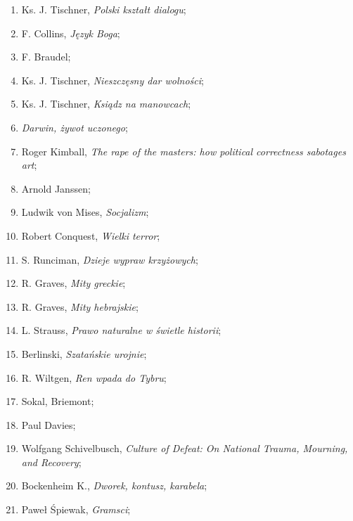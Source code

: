 \documentclass[a4paper,11pt]{article}
\begin{document}
\begin{enumerate}
\item Ks. J. Tischner, \emph{Polski kształt dialogu};

\item F. Collins, \emph{Język Boga};

\item F. Braudel;

\item Ks. J. Tischner, \emph{Nieszczęsny dar wolności};

\item Ks. J. Tischner, \emph{Ksiądz na manowcach};

\item \emph{Darwin, żywot uczonego};

\item Roger Kimball, \emph{The rape of the masters: how political
    correctness sabotages art};

\item Arnold Janssen;

\item Ludwik von Mises, \emph{Socjalizm};

\item Robert Conquest, \emph{Wielki terror};

\item S. Runciman, \emph{Dzieje wypraw krzyżowych};

\item R. Graves, \emph{Mity greckie};

\item R. Graves, \emph{Mity hebrajskie};

\item L. Strauss, \emph{Prawo naturalne w świetle historii};

\item Berlinski, \emph{Szatańskie urojnie};

\item R. Wiltgen, \emph{Ren wpada do Tybru};

\item Sokal, Briemont;

\item Paul Davies;

\item Wolfgang Schivelbusch, \emph{Culture of Defeat: On National
    Trauma, Mourning, and Recovery};

\item Bockenheim K., \emph{Dworek, kontusz, karabela};

\item Paweł Śpiewak, \emph{Gramsci};


\end{enumerate}
\end{document}
